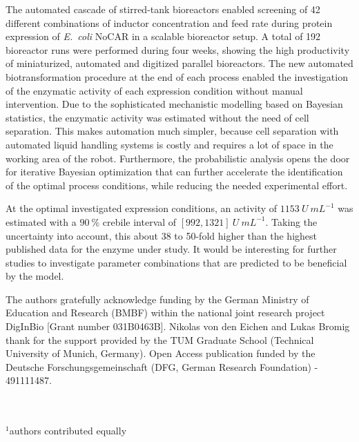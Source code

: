 \documentclass[sn-standardnature]{sn-jnl}%
\theoremstyle{thmstyleone}%
\theoremstyle{thmstyletwo}%
\theoremstyle{thmstylethree}%
\begin{document}
The automated cascade of stirred-tank bioreactors enabled screening of 42 different combinations of inductor concentration and feed rate during protein expression of \textit{E.~coli} NoCAR in a scalable bioreactor setup.
A total of 192 bioreactor runs were performed during four weeks, showing the high productivity of miniaturized, automated and digitized parallel bioreactors.
The new automated biotransformation procedure at the end of each process enabled the investigation of the enzymatic activity of each expression condition without manual intervention.
Due to the sophisticated mechanistic modelling based on Bayesian statistics, the enzymatic activity was estimated without the need of cell separation.
This makes automation much simpler, because cell separation with automated liquid handling systems is costly and requires a lot of space in the working area of the robot.
Furthermore, the probabilistic analysis opens the door for iterative Bayesian optimization that can further accelerate the identification of the optimal process conditions, while reducing the needed experimental effort.

At the optimal investigated expression conditions, an activity of $1153\ U\ mL^{-1}$ was estimated with a $90\ \%$ crebile interval of $[992, 1321]\ U\ mL^{-1}$.
Taking the uncertainty into account, this about 38 to 50-fold higher than the highest published data for the enzyme under study.
It would be interesting for further studies to investigate parameter combinations that are predicted to be beneficial by the model.

\backmatter
{}
The authors gratefully acknowledge funding by the German Ministry of Education and Research (BMBF) within the national joint research project DigInBio [Grant number 031B0463B].
Nikolas von den Eichen and Lukas Bromig thank for the support provided by the TUM Graduate School (Technical University of Munich, Germany).
Open Access publication funded by the Deutsche Forschungsgemeinschaft (DFG, German Research Foundation) - 491111487.




\mbox{}\\
\mbox{}\\
$^1$authors contributed equally
\end{document}

